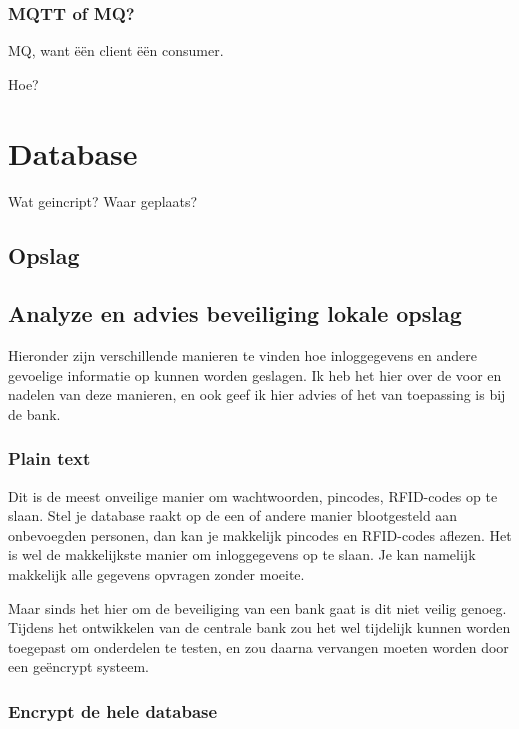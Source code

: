 \documentclass{article}
\begin{document}
\subsubsection{MQTT of MQ?}

MQ, want \"e\"en client \"e\"en consumer.

Hoe?

\section{Database}

Wat geincript?
Waar geplaats?

\newpage

\subsection{Opslag}

\subsection{Analyze en advies beveiliging lokale opslag} 

Hieronder zijn verschillende manieren te vinden hoe inloggegevens en andere gevoelige informatie op kunnen worden geslagen.
Ik heb het hier over de voor en nadelen van deze manieren, en ook geef ik hier advies of het van toepassing is bij de bank.

\subsubsection{Plain text}

Dit is de meest onveilige manier om wachtwoorden, pincodes, RFID-codes op te slaan.
Stel je database raakt op de een of andere manier blootgesteld aan onbevoegden personen, dan kan je makkelijk pincodes en RFID-codes aflezen. 
Het is wel de makkelijkste manier om inloggegevens op te slaan.
Je kan namelijk makkelijk alle gegevens opvragen zonder moeite.

Maar sinds het hier om de beveiliging van een bank gaat is dit niet veilig genoeg.
Tijdens het ontwikkelen van de centrale bank zou het wel tijdelijk kunnen worden toegepast om onderdelen te testen, en zou daarna vervangen moeten worden door een ge\"encrypt systeem.

\subsubsection{Encrypt de hele database}
\end{document}
